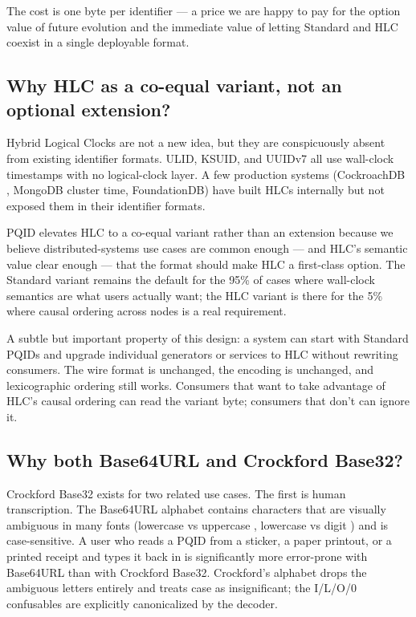 The cost is one byte per identifier --- a price we are happy to pay for the option value of future evolution and the immediate value of letting Standard and HLC coexist in a single deployable format.

\subsection{Why HLC as a co-equal variant, not an optional extension?}

Hybrid Logical Clocks \citep{kulkarni2014hlc} are not a new idea, but they are conspicuously absent from existing identifier formats. ULID, KSUID, and UUIDv7 all use wall-clock timestamps with no logical-clock layer. A few production systems (CockroachDB \citep{cockroachdb_hlc}, MongoDB cluster time, FoundationDB) have built HLCs internally but not exposed them in their identifier formats.

PQID elevates HLC to a co-equal variant rather than an extension because we believe distributed-systems use cases are common enough --- and HLC's semantic value clear enough --- that the format should make HLC a first-class option. The Standard variant remains the default for the 95\% of cases where wall-clock semantics are what users actually want; the HLC variant is there for the 5\% where causal ordering across nodes is a real requirement.

A subtle but important property of this design: a system can start with Standard PQIDs and upgrade individual generators or services to HLC without rewriting consumers. The wire format is unchanged, the encoding is unchanged, and lexicographic ordering still works. Consumers that want to take advantage of HLC's causal ordering can read the variant byte; consumers that don't can ignore it.

\subsection{Why both Base64URL and Crockford Base32?}

Crockford Base32 exists for two related use cases. The first is human transcription. The Base64URL alphabet contains characters that are visually ambiguous in many fonts (lowercase  vs uppercase , lowercase  vs digit ) and is case-sensitive. A user who reads a PQID from a sticker, a paper printout, or a printed receipt and types it back in is significantly more error-prone with Base64URL than with Crockford Base32. Crockford's alphabet drops the ambiguous letters entirely and treats case as insignificant; the I/L/O/0 confusables are explicitly canonicalized by the decoder.

